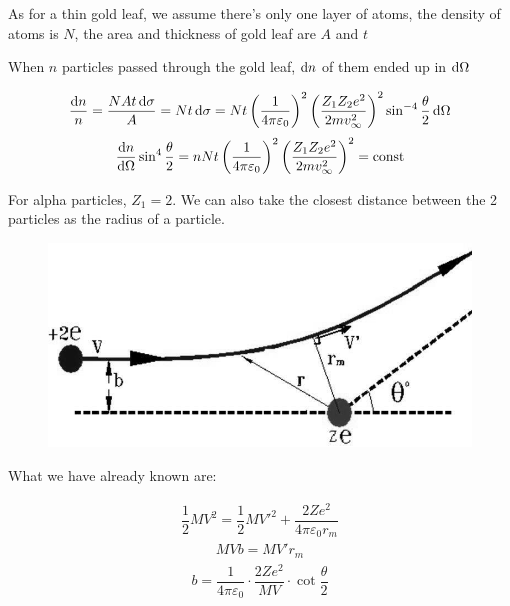 As for a thin gold leaf, we assume there's only one layer of atoms, the density of atoms is $N$, the area and thickness of gold leaf are $A$ and $t$

When $n$ particles passed through the gold leaf, $\mathop{}\!\mathrm{d} n$ of them ended up in $\mathop{}\!\mathrm{d} \Omega$

\begin{equation*}
  \begin{aligned}
    \dfrac{\mathop{}\!\mathrm{d} n}{n} = \dfrac{N A t \mathop{}\!\mathrm{d} \sigma}{A} = N t \mathop{}\!\mathrm{d} \sigma = N t \left( \dfrac{1}{4 \pi \varepsilon_0}  \right)^2 \left( \dfrac{Z_1 Z_2 e^2}{2 m v_{\infty}^2}  \right)^2 \sin^{-4} \dfrac{\theta}{2} \mathop{}\!\mathrm{d} \Omega 
  \end{aligned}
\end{equation*}
\begin{equation}
  \begin{aligned}
    \dfrac{\mathop{}\!\mathrm{d} n}{\mathop{}\!\mathrm{d} \Omega} \sin^4 \dfrac{\theta}{2} = n N t \left( \dfrac{1}{4 \pi \varepsilon_0}  \right)^2 \left( \dfrac{Z_1 Z_2 e^2}{2 m v_{\infty}^2}  \right)^2 = \mathrm{const}
  \end{aligned}
\end{equation}

For alpha particles, $Z_1 = 2$. We can also take the closest distance between the 2 particles as the radius of a particle.

\begin{figure}[H]
  \centering
  \includegraphics[width=0.5\linewidth]{figures/Rutherford-2}
  \label{fig:}
\end{figure}

What we have already known are:

\begin{equation*}
  \begin{aligned}
    \dfrac{1}{2} M V^2 = \dfrac{1}{2} M V'^{2} + \dfrac{2 Z e^2}{4 \pi \varepsilon_0 r_m}  
  \end{aligned}
\end{equation*}
\begin{equation*}
  \begin{aligned}
    M V b = M V' r_m
  \end{aligned}
\end{equation*}
\begin{equation*}
  \begin{aligned}
    b = \dfrac{1}{4 \pi \varepsilon_0} \cdot \dfrac{2 Z e^2}{M V} \cdot \cot \dfrac{\theta}{2} 
  \end{aligned}
\end{equation*}

